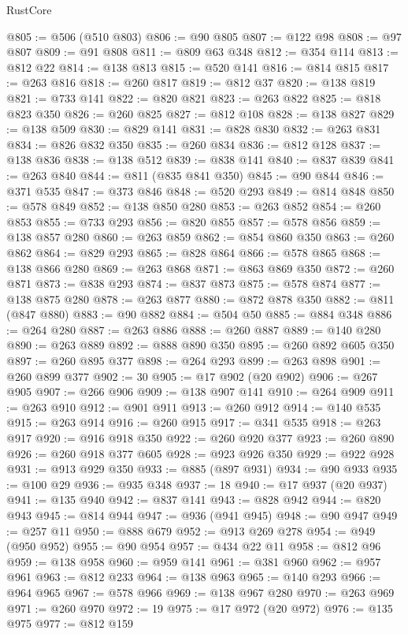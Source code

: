 \begin{lexlean}{RustCore}
\begin{coremodule}
@805 := @506 (@510 @803)
@806 := @90 @805
@807 := @122 @98
@808 := @97 @807
@809 := @91 @808
@811 := @809 @63 @348
@812 := @354 @114
@813 := @812 @22
@814 := @138 @813
@815 := @520 @141
@816 := @814 @815
@817 := @263 @816
@818 := @260 @817
@819 := @812 @37
@820 := @138 @819
@821 := @733 @141
@822 := @820 @821
@823 := @263 @822
@825 := @818 @823 @350
@826 := @260 @825
@827 := @812 @108
@828 := @138 @827
@829 := @138 @509
@830 := @829 @141
@831 := @828 @830
@832 := @263 @831
@834 := @826 @832 @350
@835 := @260 @834
@836 := @812 @128
@837 := @138 @836
@838 := @138 @512
@839 := @838 @141
@840 := @837 @839
@841 := @263 @840
@844 := @811 (@835 @841 @350)
@845 := @90 @844
@846 := @371 @535
@847 := @373 @846
@848 := @520 @293
@849 := @814 @848
@850 := @578 @849
@852 := @138 @850 @280
@853 := @263 @852
@854 := @260 @853
@855 := @733 @293
@856 := @820 @855
@857 := @578 @856
@859 := @138 @857 @280
@860 := @263 @859
@862 := @854 @860 @350
@863 := @260 @862
@864 := @829 @293
@865 := @828 @864
@866 := @578 @865
@868 := @138 @866 @280
@869 := @263 @868
@871 := @863 @869 @350
@872 := @260 @871
@873 := @838 @293
@874 := @837 @873
@875 := @578 @874
@877 := @138 @875 @280
@878 := @263 @877
@880 := @872 @878 @350
@882 := @811 (@847 @880)
@883 := @90 @882
@884 := @504 @50
@885 := @884 @348
@886 := @264 @280
@887 := @263 @886
@888 := @260 @887
@889 := @140 @280
@890 := @263 @889
@892 := @888 @890 @350
@895 := @260 @892 @605 @350
@897 := @260 @895 @377
@898 := @264 @293
@899 := @263 @898
@901 := @260 @899 @377
@902 := 30
@905 := @17 @902 (@20 @902)
@906 := @267 @905
@907 := @266 @906
@909 := @138 @907 @141
@910 := @264 @909
@911 := @263 @910
@912 := @901 @911
@913 := @260 @912
@914 := @140 @535
@915 := @263 @914
@916 := @260 @915
@917 := @341 @535
@918 := @263 @917
@920 := @916 @918 @350
@922 := @260 @920 @377
@923 := @260 @890
@926 := @260 @918 @377 @605
@928 := @923 @926 @350
@929 := @922 @928
@931 := @913 @929 @350
@933 := @885 (@897 @931)
@934 := @90 @933
@935 := @100 @29
@936 := @935 @348
@937 := 18
@940 := @17 @937 (@20 @937)
@941 := @135 @940
@942 := @837 @141
@943 := @828 @942
@944 := @820 @943
@945 := @814 @944
@947 := @936 (@941 @945)
@948 := @90 @947
@949 := @257 @11
@950 := @888 @679
@952 := @913 @269 @278
@954 := @949 (@950 @952)
@955 := @90 @954
@957 := @434 @22 @11
@958 := @812 @96
@959 := @138 @958
@960 := @959 @141
@961 := @381 @960
@962 := @957 @961
@963 := @812 @233
@964 := @138 @963
@965 := @140 @293
@966 := @964 @965
@967 := @578 @966
@969 := @138 @967 @280
@970 := @263 @969
@971 := @260 @970
@972 := 19
@975 := @17 @972 (@20 @972)
@976 := @135 @975
@977 := @812 @159

\end{coremodule}
\end{lexlean}
